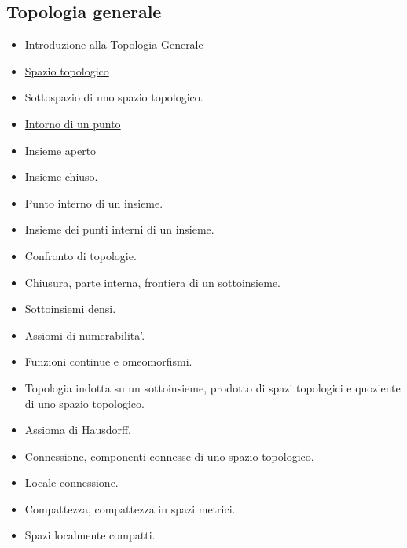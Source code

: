 \documentclass[a4paper,10pt]{article}
\begin{document}
  \subsection*{Topologia generale}
    \begin{itemize}
    \item \href{Topologia.pdf}{Introduzione alla Topologia Generale}
    \item \href{SpazioTopologico.pdf}{Spazio topologico}
    \item Sottospazio di uno spazio topologico.
    \item \href{IntornoPunto.pdf}{Intorno di un punto} 
    \item \href{InsiemeAperto.pdf}{Insieme aperto}
    \item Insieme chiuso.
    \item Punto interno di un insieme.
    \item Insieme dei punti interni di un insieme.
    \item Confronto di topologie. 
    \item Chiusura, parte interna, frontiera di un sottoinsieme. 
    \item Sottoinsiemi densi. 
    \item Assiomi di numerabilita'. 
    \item Funzioni continue e omeomorfismi. 
    \item Topologia indotta su un sottoinsieme, prodotto di spazi topologici e quoziente di uno spazio topologico.  
    \item Assioma di Hausdorff.  
    \item Connessione, componenti connesse di uno spazio topologico. 
    \item Locale connessione. 
    \item Compattezza, compattezza in spazi metrici. 
    \item Spazi localmente compatti. 
    \end{itemize}
\end{document}
